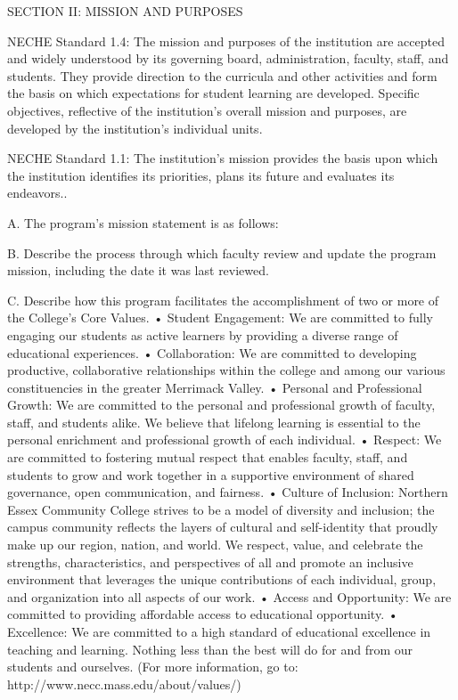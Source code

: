 SECTION II: MISSION AND PURPOSES

NECHE Standard 1.4: The mission and purposes of the institution are accepted and widely understood by its governing board, administration, faculty, staff, and students. They provide direction to the curricula and other activities and form the basis on which expectations for student learning are developed. Specific objectives, reflective of the institution’s overall mission and purposes, are developed by the institution’s individual units.

NECHE Standard 1.1: The institution’s mission provides the basis upon which the institution identifies its priorities, plans its future and evaluates its endeavors..

A. The program’s mission statement is as follows:



B. Describe the process through which faculty review and update the program mission, including the date it was last reviewed. 











C. Describe how this program facilitates the accomplishment of two or more of the College’s Core Values.
    • Student Engagement: We are committed to fully engaging our students as active learners by providing a diverse range of educational experiences.
    • Collaboration: We are committed to developing productive, collaborative relationships within the college and among our various constituencies in the greater Merrimack Valley.
    • Personal and Professional Growth: We are committed to the personal and professional growth of faculty, staff, and students alike. We believe that lifelong learning is essential to the personal enrichment and professional growth of each individual.
    • Respect: We are committed to fostering mutual respect that enables faculty, staff, and students to grow and work together in a supportive environment of shared governance, open communication, and fairness.
    • Culture of Inclusion: Northern Essex Community College strives to be a model of diversity and inclusion; the campus community reflects the layers of cultural and self-identity that proudly make up our region, nation, and world. We respect, value, and celebrate the strengths, characteristics, and perspectives of all and promote an inclusive environment that leverages the unique contributions of each individual, group, and organization into all aspects of our work.
    • Access and Opportunity: We are committed to providing affordable access to educational opportunity.
    • Excellence: We are committed to a high standard of educational excellence in teaching and learning. Nothing less than the best will do for and from our students and ourselves.
(For more information, go to: http://www.necc.mass.edu/about/values/)













